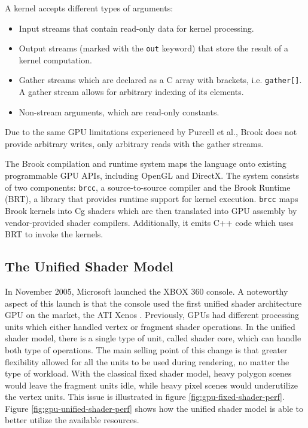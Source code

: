A kernel accepts different types of arguments:

\begin{itemize}
    \item Input streams that contain read-only data for kernel processing.
    \item Output streams (marked with the \texttt{out} keyword) that store the result of a kernel computation.
    \item Gather streams which are declared as a C array with brackets, i.e. \texttt{gather[]}. A gather stream allows for arbitrary indexing of its elements.
    \item Non-stream arguments, which are read-only constants.
\end{itemize}

Due to the same GPU limitations experienced by Purcell et al., Brook does not provide arbitrary writes, only arbitrary reads with the gather streams.

The Brook compilation and runtime system maps the language onto existing programmable GPU APIs, including OpenGL and DirectX. The system consists of two components: \texttt{brcc}, a source-to-source compiler and the Brook Runtime (BRT), a library that provides runtime support for kernel execution. \texttt{brcc} maps Brook kernels into Cg shaders which are then translated into GPU assembly by vendor-provided shader compilers. Additionally, it emits C++ code which uses BRT to invoke the kernels.

\subsection{The Unified Shader Model}

In November 2005, Microsoft launched the XBOX 360 console. A noteworthy aspect of this launch is that the console used the first unified shader architecture GPU on the market, the ATI Xenos \cite{xbox_360_specs}. Previously, GPUs had different processing units which either handled vertex or fragment shader operations. In the unified shader model, there is a single type of unit, called shader core, which can handle both type of operations. The main selling point of this change is that greater flexibility allowed for all the units to be used during rendering, no matter the type of workload. With the classical fixed shader model, heavy polygon scenes would leave the fragment units idle, while heavy pixel scenes would underutilize the vertex units. This issue is illustrated in figure \ref{fig:gpu-fixed-shader-perf}. Figure \ref{fig:gpu-unified-shader-perf} shows how the unified shader model is able to better utilize the available resources.

